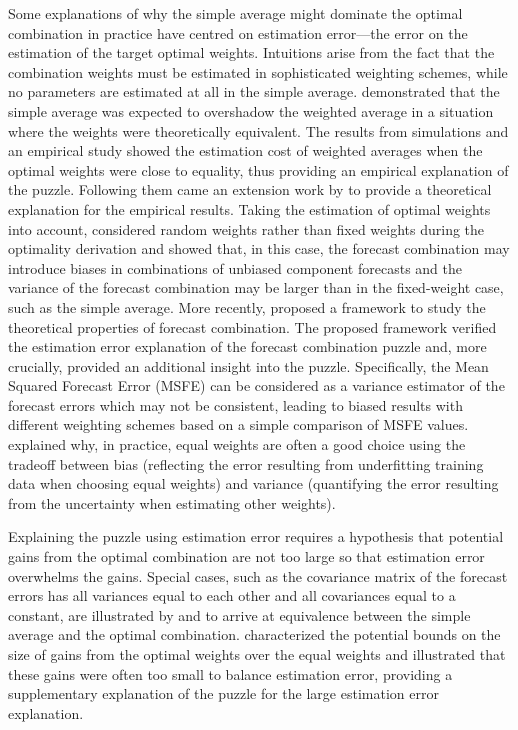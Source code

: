 \documentclass[11pt]{article}
\begin{document}
Some explanations of why the simple average might dominate the optimal combination in practice have centred on estimation error---the error on the estimation of the target optimal weights. Intuitions arise from the fact that the combination weights must be estimated in sophisticated weighting schemes, while no parameters are estimated at all in the simple average. \cite{Smith2009-wd} demonstrated that the simple average was expected to overshadow the weighted average in a situation where the weights were theoretically equivalent. The results from simulations and an empirical study showed the estimation cost of weighted averages when the optimal weights were close to equality, thus providing an empirical explanation of the puzzle. Following them came an extension work by \cite{Claeskens2016-pv} to provide a theoretical explanation for the empirical results. Taking the estimation of optimal weights into account, \cite{Claeskens2016-pv} considered random weights rather than fixed weights during the optimality derivation and showed that, in this case, the forecast combination may introduce biases in combinations of unbiased component forecasts and the variance of the forecast combination may be larger than in the fixed-weight case, such as the simple average. More recently, \cite{Chan2018-jl} proposed a framework to study the theoretical properties of forecast combination. The proposed framework verified the estimation error explanation of the forecast combination puzzle and, more crucially, provided an additional insight into the puzzle. Specifically, the Mean Squared Forecast Error (MSFE) can be considered as a variance estimator of the forecast errors which may not be consistent, leading to biased results with different weighting schemes based on a simple comparison of MSFE values. \cite{Blanc2020-pg} explained why, in practice, equal weights are often a good choice using the tradeoff between bias (reflecting the error resulting from underfitting training data when choosing equal weights) and variance (quantifying the error resulting from the uncertainty when estimating other weights).

Explaining the puzzle using estimation error requires a hypothesis that potential gains from the optimal combination are not too large so that estimation error overwhelms the gains. Special cases, such as the covariance matrix of the forecast errors has all variances equal to each other and all covariances equal to a constant, are illustrated by \cite{Timmermann2006-en} and \cite{Hsiao2014-ug} to arrive at equivalence between the simple average and the optimal combination. \cite{Elliott2011-ab} characterized the potential bounds on the size of gains from the optimal weights over the equal weights and illustrated that these gains were often too small to balance estimation error, providing a supplementary explanation of the puzzle for the large estimation error explanation.
\end{document}
